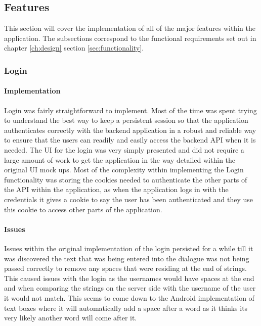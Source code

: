 \subsection{Features}

This section will cover the implementation of all of the major features within the application. The subsections correspond to the functional requirements set out in chapter \ref{ch:design} section \ref{sec:functionality}.

\subsubsection*{Login}

\paragraph*{Implementation}

Login was fairly straightforward to implement. Most of the time was spent trying to understand the best way to keep a persistent session so that the application authenticates correctly with the backend application in a robust and reliable way to ensure that the users can readily and easily access the backend API when it is needed. The UI for the login was very simply presented and did not require a large amount of work to get the application in the way detailed within the original UI mock ups. Most of the complexity within implementing the Login functionality was storing the cookies needed to authenticate the other parts of the API within the application, as when the application logs in with the credentials it gives a cookie to say the user has been authenticated and they use this cookie to access other parts of the application.

\paragraph*{Issues}

Issues within the original implementation of the login persisted for a while till it was discovered the text that was being entered into the dialogue was not being passed correctly to remove any spaces that were residing at the end of strings. This caused issues with the login as the usernames would have spaces at the end and when comparing the strings on the server side with the username of the user it would not match. This seems to come down to the Android implementation of text boxes where it will automatically add a space after a word as it thinks its very likely another word will come after it.


